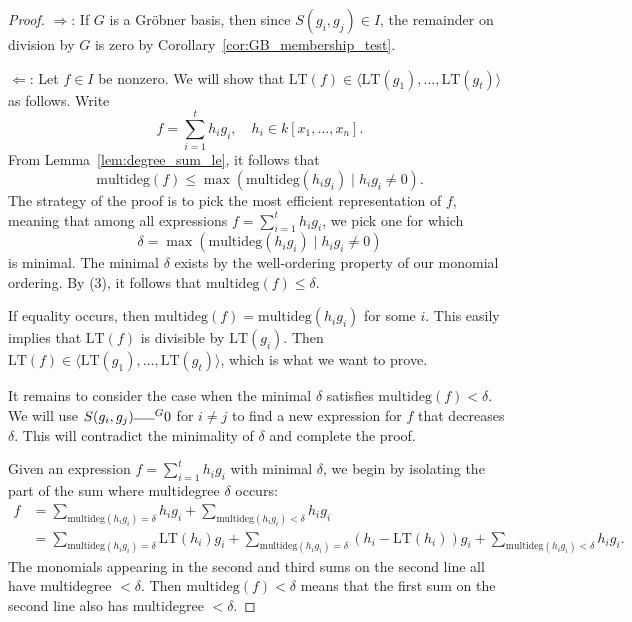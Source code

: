 \begin{proof}
  \leanok
  $\Rightarrow$: If $G$ is a Gr\"obner basis, then since $S(g_i, g_j) \in I$, the remainder on division by $G$ is zero by Corollary~\ref{cor:GB_membership_test}.

  $\Leftarrow$: Let $f \in I$ be nonzero. We will show that $\text{LT}(f) \in \langle\text{LT}(g_1), \dots, \text{LT}(g_t)\rangle$ as follows. Write
  \[
  f = \sum_{i=1}^t h_i g_i, \quad h_i \in k[x_1, \dots, x_n].
  \]
  From Lemma~\ref{lem:degree_sum_le}, it follows that
  \begin{equation} \tag{3}
  \text{multideg}(f) \le \max(\text{multideg}(h_i g_i) \mid h_i g_i \ne 0).
  \end{equation}
  The strategy of the proof is to pick the most efficient representation of $f$, meaning that among all expressions $f = \sum_{i=1}^t h_i g_i$, we pick one for which
  \[
  \delta = \max(\text{multideg}(h_i g_i) \mid h_i g_i \ne 0)
  \]
  is minimal. The minimal $\delta$ exists by the well-ordering property of our monomial ordering. By (3), it follows that $\text{multideg}(f) \le \delta$.

  If equality occurs, then $\text{multideg}(f) = \text{multideg}(h_i g_i)$ for some $i$. This easily implies that $\text{LT}(f)$ is divisible by $\text{LT}(g_i)$. Then $\text{LT}(f) \in \langle\text{LT}(g_1), \dots, \text{LT}(g_t)\rangle$, which is what we want to prove.

  It remains to consider the case when the minimal $\delta$ satisfies $\text{multideg}(f) < \delta$. We will use $S(g_i, g_j) \overline{\hspace{1.5em}}^G 0$ for $i \ne j$ to find a new expression for $f$ that decreases $\delta$. This will contradict the minimality of $\delta$ and complete the proof.

  Given an expression $f = \sum_{i=1}^t h_i g_i$ with minimal $\delta$, we begin by isolating the part of the sum where multidegree $\delta$ occurs:
  \begin{align} \tag{4}
  f &= \sum_{\text{multideg}(h_i g_i) = \delta} h_i g_i + \sum_{\text{multideg}(h_i g_i) < \delta} h_i g_i \\
  &= \sum_{\text{multideg}(h_i g_i) = \delta} \text{LT}(h_i) g_i + \sum_{\text{multideg}(h_i g_i) = \delta} (h_i - \text{LT}(h_i)) g_i + \sum_{\text{multideg}(h_i g_i) < \delta} h_i g_i. \nonumber
  \end{align}
  The monomials appearing in the second and third sums on the second line all have multidegree $<\delta$. Then $\text{multideg}(f) < \delta$ means that the first sum on the second line also has multidegree $<\delta$.


\end{proof}
